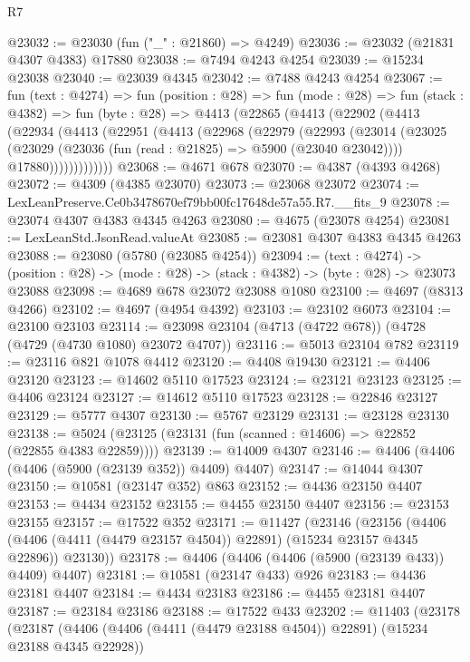 \begin{lexlean}{R7}
\begin{coremodule}
@23032 := @23030 (fun ("_" : @21860) => @4249)
@23036 := @23032 (@21831 @4307 @4383) @17880
@23038 := @7494 @4243 @4254
@23039 := @15234 @23038
@23040 := @23039 @4345
@23042 := @7488 @4243 @4254
@23067 := fun (text : @4274) =>
  fun (position : @28) =>
  fun (mode : @28) =>
  fun (stack : @4382) =>
  fun (byte : @28) =>
  @4413
    (@22865
      (@4413
        (@22902
          (@4413
            (@22934
              (@4413
                (@22951
                  (@4413
                    (@22968
                      (@22979
                        (@22993
                          (@23014
                            (@23025
                              (@23029 (@23036 (fun (read : @21825) => @5900 (@23040 @23042))))
                              @17880)))))))))))))
@23068 := @4671 @678
@23070 := @4387 (@4393 @4268)
@23072 := @4309 (@4385 @23070)
@23073 := @23068 @23072
@23074 := LexLeanPreserve.Ce0b3478670ef79bb00fc17648de57a55.R7.__fits_9
@23078 := @23074 @4307 @4383 @4345 @4263
@23080 := @4675 (@23078 @4254)
@23081 := LexLeanStd.JsonRead.valueAt
@23085 := @23081 @4307 @4383 @4345 @4263
@23088 := @23080 (@5780 (@23085 @4254))
@23094 := (text : @4274) ->
  (position : @28) -> (mode : @28) -> (stack : @4382) -> (byte : @28) -> @23073 @23088
@23098 := @4689 @678 @23072 @23088 @1080
@23100 := @4697 (@8313 @4266)
@23102 := @4697 (@4954 @4392)
@23103 := @23102 @6073
@23104 := @23100 @23103
@23114 := @23098 @23104 (@4713 (@4722 @678)) (@4728 (@4729 (@4730 @1080) @23072 @4707))
@23116 := @5013 @23104 @782
@23119 := @23116 @821 @1078 @4412
@23120 := @4408 @19430
@23121 := @4406 @23120
@23123 := @14602 @5110 @17523
@23124 := @23121 @23123
@23125 := @4406 @23124
@23127 := @14612 @5110 @17523
@23128 := @22846 @23127
@23129 := @5777 @4307
@23130 := @5767 @23129
@23131 := @23128 @23130
@23138 := @5024 (@23125 (@23131 (fun (scanned : @14606) => @22852 (@22855 @4383 @22859))))
@23139 := @14009 @4307
@23146 := @4406 (@4406 (@4406 (@5900 (@23139 @352)) @4409) @4407)
@23147 := @14044 @4307
@23150 := @10581 (@23147 @352) @863
@23152 := @4436 @23150 @4407
@23153 := @4434 @23152
@23155 := @4455 @23150 @4407
@23156 := @23153 @23155
@23157 := @17522 @352
@23171 := @11427
    (@23146
      (@23156
        (@4406 (@4406 (@4411 (@4479 @23157 @4504)) @22891) (@15234 @23157 @4345 @22896))
        @23130))
@23178 := @4406 (@4406 (@4406 (@5900 (@23139 @433)) @4409) @4407)
@23181 := @10581 (@23147 @433) @926
@23183 := @4436 @23181 @4407
@23184 := @4434 @23183
@23186 := @4455 @23181 @4407
@23187 := @23184 @23186
@23188 := @17522 @433
@23202 := @11403
    (@23178
      (@23187
        (@4406 (@4406 (@4411 (@4479 @23188 @4504)) @22891) (@15234 @23188 @4345 @22928))

\end{coremodule}
\end{lexlean}
